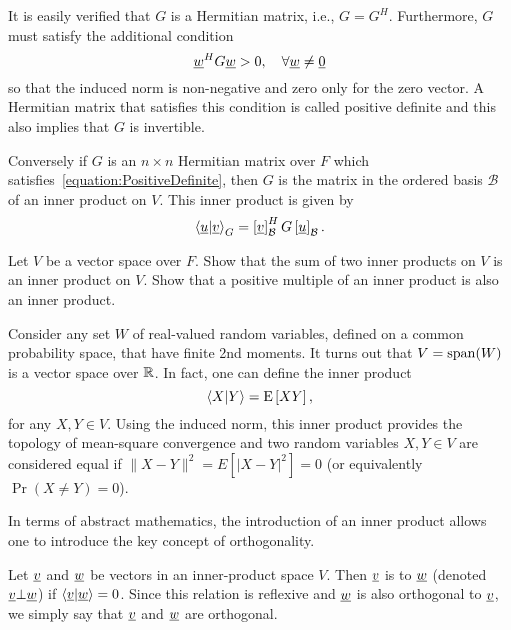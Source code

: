It is easily verified that $G$ is a Hermitian matrix, i.e., $G = G^H$.
Furthermore, $G$ must satisfy the additional condition
\begin{equation} \label{equation:PositiveDefinite}
\underline{w}^H G \underline{w} > 0, \quad \forall \underline{w} \neq \underline{0}
\end{equation}
so that the induced norm is non-negative and zero only for the zero vector.
A Hermitian matrix that satisfies this condition is called positive definite and this also implies that $G$ is invertible.

Conversely if $G$ is an $n \times n$ Hermitian matrix over $F$ which satisfies~\eqref{equation:PositiveDefinite}, then $G$ is the matrix in the ordered basis $\mathcal{B}$ of an inner product on $V$.
This inner product is given by
\begin{equation*}
\left\langle \underline{u} | \underline{v} \right\rangle_G
= \left[ \underline{v} \right]_{\mathcal{B}}^H G \left[ \underline{u} \right]_{\mathcal{B}}.
\end{equation*}

\begin{problem}
Let $V$ be a vector space over $F$.
Show that the sum of two inner products on $V$ is an inner product on $V$.
Show that a positive multiple of an inner product is also an inner product.
\end{problem}

\begin{example}
Consider any set $W$ of real-valued random variables, defined on a common probability space, that have finite 2nd moments.
It turns out that $V = \mathrm{span} (W)$ is a vector space over $\mathbb{R}$.
In fact, one can define the inner product
\begin{equation*}
\left\langle X | Y \right\rangle = \mathrm{E} \left[ XY \right] ,
\end{equation*}
for any $X,Y \in V$.
Using the induced norm, this inner product provides the topology of mean-square convergence and two random variables $X,Y\in V$ are considered equal if $\| X-Y \|^2 = E \left[ |X-Y|^2 \right] = 0$ (or equivalently $\Pr (X \neq Y ) = 0$).
\end{example}

In terms of abstract mathematics, the introduction of an inner product allows one to introduce the key concept of orthogonality.

\begin{definition}
Let $\underline{v}$ and $\underline{w}$ be vectors in an inner-product space $V$.
Then $\underline{v}$ is  to $\underline{w}$ (denoted $\underline{v} \bot \underline{w}$) if $\left\langle \underline{v} | \underline{w} \right\rangle = 0$.
Since this relation is reflexive and $\underline{w}$ is also orthogonal to $\underline{v}$, we simply say that $\underline{v}$ and $\underline{w}$ are orthogonal.
\end{definition}

